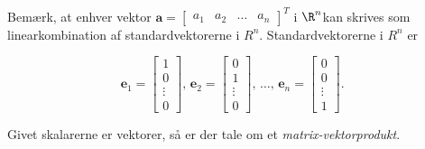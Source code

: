 Bemærk, at enhver vektor 
$
\textbf{a}=
\begin{bmatrix}
a_1 & a_2 & \ldots & a_n
\end{bmatrix}^T
$
i $\R^n$kan skrives som linearkombination af standardvektorerne i $R^n$. 
Standardvektorerne i $R^n$ er 

$$
\textbf{e}_1=
\begin{bmatrix}
1 \\ 
0 \\ 
\vdots \\
0
\end{bmatrix}
\text{, }
\textbf{e}_2=
\begin{bmatrix}
0 \\ 
1 \\ 
\vdots \\
0
\end{bmatrix}
\text{, }
\ldots
\text{, }
\textbf{e}_n=
\begin{bmatrix}
0 \\ 
0 \\ 
\vdots \\
1
\end{bmatrix}
\text{. }
$$

Givet skalarerne er vektorer, så er der tale om et \textit{matrix-vektorprodukt}.

